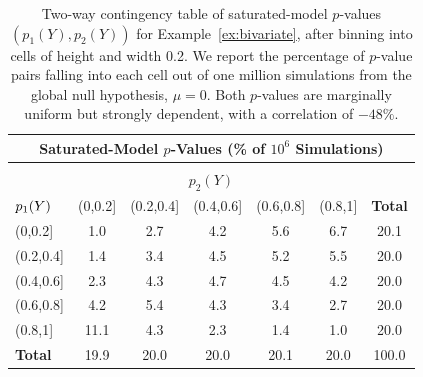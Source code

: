 \documentclass{article}
\begin{document}
\begin{table}[ht]
  \centering
  \begin{tabular}{l|ccccc|c}
    \multicolumn{7}{c}{Saturated-Model $p$-Values 
      (\% of $10^6$ Simulations)}\\[7pt]
    \hline
    \multicolumn{7}{c}{}\\[-1.5ex]
    \multicolumn{7}{c}{$p_2(Y)$}\\[5pt]
    ${\large p_1(Y)}$ & (0,0.2] & (0.2,0.4] & (0.4,0.6] & (0.6,0.8] & (0.8,1] & \textbf{Total} \\ 
    \hline
    (0,0.2] & 1.0 & 2.7 & 4.2 & 5.6 & 6.7 & 20.1 \\ 
    (0.2,0.4] & 1.4 & 3.4 & 4.5 & 5.2 & 5.5 & 20.0 \\ 
    (0.4,0.6] & 2.3 & 4.3 & 4.7 & 4.5 & 4.2 & 20.0 \\ 
    (0.6,0.8] & 4.2 & 5.4 & 4.3 & 3.4 & 2.7 & 20.0 \\ 
    (0.8,1] & 11.1 & 4.3 & 2.3 & 1.4 & 1.0 & 20.0 \\ 
    \hline
    \textbf{Total} & 19.9 & 20.0 & 20.0 & 20.1 & 20.0 & 100.0 \\ 
    \hline
  \end{tabular}
  \caption{Two-way contingency table of saturated-model $p$-values $(p_1(Y), p_2(Y))$ for Example~\ref{ex:bivariate}, after binning into cells of height and width 0.2. We report the percentage of $p$-value pairs falling into each cell out of one million simulations from the global null hypothesis, $\mu=0$. Both $p$-values are marginally uniform but strongly dependent, with a correlation of $-48\%$.}
\label{tab:bv_twoWayTable}
\end{table}

\end{document}
